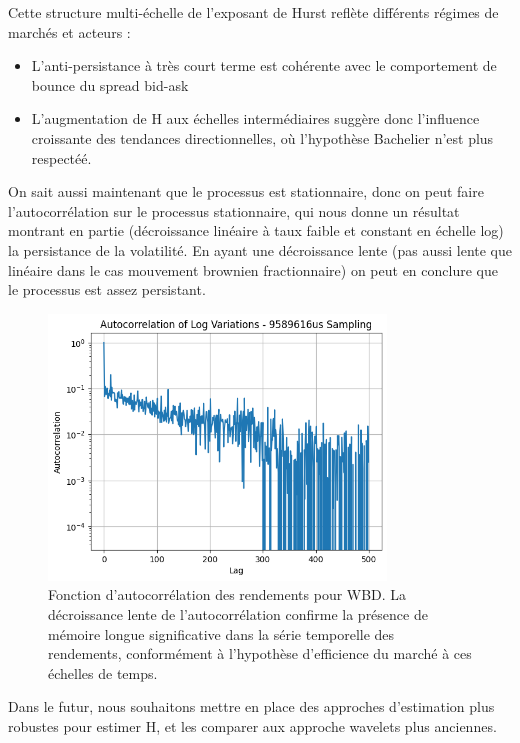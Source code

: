 \documentclass[10pt,a4paper]{article}
\theoremstyle{definition}
\theoremstyle{remark}
\begin{document}
\begin{itemize}
Cette structure multi-échelle de l'exposant de Hurst reflète différents régimes de marchés et acteurs :
\begin{itemize}
    \item L'anti-persistance à très court terme est cohérente avec le comportement de bounce du spread bid-ask
    \item L'augmentation de H aux échelles intermédiaires suggère donc l'influence croissante des tendances directionnelles, où l'hypothèse Bachelier n'est plus respectéé.
\end{itemize}


On sait aussi maintenant que le processus est stationnaire, donc on peut faire l'autocorrélation sur le processus stationnaire, qui nous donne un résultat montrant en partie
(décroissance linéaire à taux faible et constant en échelle log) la persistance de la volatilité. En ayant une décroissance lente (pas aussi lente que linéaire dans le cas mouvement brownien fractionnaire)
on peut en conclure que le processus est assez persistant.

\begin{figure}[h!]
    \centering
    \includegraphics[width=0.8\textwidth]{autocorr.png}
    \caption{Fonction d'autocorrélation des rendements pour WBD. La décroissance lente de l'autocorrélation confirme la présence de mémoire longue significative dans la série temporelle des rendements, conformément à l'hypothèse d'efficience du marché à ces échelles de temps.}
    \label{fig:autocorr_wbd}
\end{figure}



Dans le futur, nous souhaitons mettre en place des approches d'estimation plus robustes \cite{chong2024minimax, chong2024clt} pour estimer H, et les comparer aux approche wavelets plus anciennes. 


\end{itemize}
\end{document}
